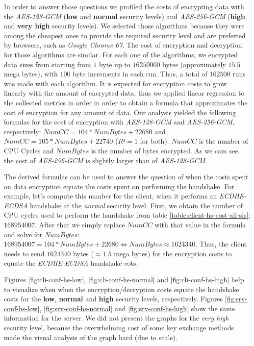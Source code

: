 In order to answer those questions we profiled the costs of encrypting data with the \textit{AES-128-GCM} (\textbf{low} and 
\textbf{normal} security levels) and \textit{AES-256-GCM} (\textbf{high} and \textbf{very high} security levels). 
We selected those algorithms because they were among the cheapest ones to provide the required security level and are preferred by
browsers, such as \textit{Google Chrome 67}. The cost of encryption and decryption for those algorithms are similar\cite{ertaul2016performance}.
For each
one of the algorithms, we encrypted data sizes from starting from $1$ byte up to $16250000$ bytes (approximately $15.5$ mega bytes),
with $100$ byte increments in each run. Thus, a total of $162500$ runs was made with each algorithm. It is expected for encryption costs to
grow linearly with the amount of encrypted data, thus we applied linear regression to the collected metrics in order in order to
obtain a formula that approximates the cost of encryption for any amount of data. Our analysis yielded the following formulas for the
cost of encryption with \textit{AES-128-GCM} and \textit{AES-256-GCM}, respectively: $NumCC=104*NumBytes+22680$ and $NumCC=105*NumBytes+22740$ ($R²=1$ for both).
$NumCC$ is the number of CPU Cycles and $NumBytes$ is the number of bytes encrypted. As we cam see. the cost of \textit{AES-256-GCM} is slightly
larger than of \textit{AES-128-GCM}.

The derived formulas can be used to answer the question of when the costs spent on data encryption equate the costs
spent on performing the handshake. For example, let's compute this number for the client, when it performs an
\textit{ECDHE-ECDSA} handshake at the \textit{normal} security level. First, we obtain the number of CPU cycles
used to perform the handshake from table \ref{table:client-hs-cost-all-sls}: $168954007$. After that we simply
replace $NumCC$ with that value in the formula and solve for $NumBytes$: $168954007=104*NumBytes+22680 \Leftrightarrow NumBytes \approx 1624340$.
Thus, the client needs to send $1624340$ bytes ($\approx 1.5$ mega bytes) for the encryption costs to equate the \textit{ECDHE-ECDSA} handshake cots.

Figures \ref{fig:cli-conf-hs-low}, \ref{fig:cli-conf-hs-normal} and \ref{fig:cli-conf-hs-high} help to visualize when
when the encryption/decryption costs equate the handshake costs for the \textbf{low}, \textbf{normal} and \textbf{high}
security levels, respectively. Figures \ref{fig:srv-conf-hs-low}, \ref{fig:srv-conf-hs-normal} and \ref{fig:srv-conf-hs-high}
show the same information for the server. We did not present the graphs for the \textit{very high} security level,
because the overwhelming cost of some key exchange methods made the visual analysis of the graph hard (due to scale).

